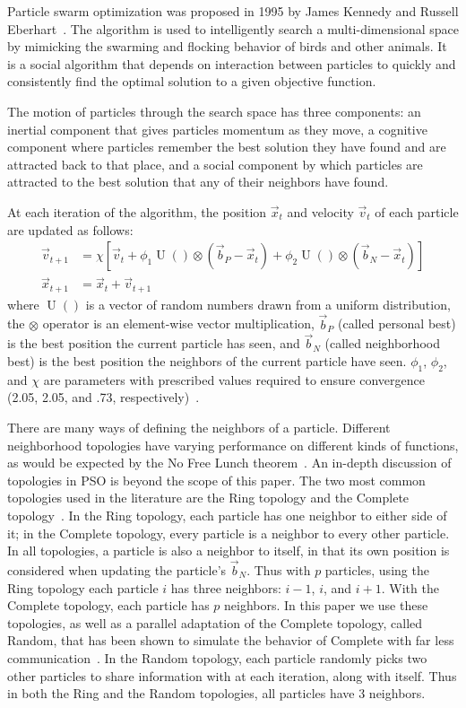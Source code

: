 \documentclass[oneside,honors]{honors}
\DeclareMathOperator{\URand}{U}
\providecommand{\ppos}{\ensuremath{\Vec{x}}}
\providecommand{\pvel}{\ensuremath{\Vec{v}}}
\providecommand{\nbest}{\ensuremath{\Vec{b}_N}}
\providecommand{\pbest}{\ensuremath{\Vec{b}_P}}
\providecommand{\constriction}{\ensuremath{\chi}}
\providecommand{\coeff}{\ensuremath{\phi}}
\begin{document}
Particle swarm optimization was proposed in 1995 by James Kennedy and Russell
Eberhart~\cite{kennedy-icnn95}.  The algorithm is used to intelligently search
a multi-dimensional space by mimicking the swarming and flocking behavior of
birds and other animals. It is a social algorithm that depends on interaction
between particles to quickly and consistently find the optimal solution to a
given objective function.

The motion of particles through the search space has three components: an
inertial component that gives particles momentum as they move, a cognitive
component where particles remember the best solution they have found and are
attracted back to that place, and a social component by which particles are
attracted to the best solution that any of their neighbors have found.

At each iteration of the algorithm, the position $\ppos_t$ and velocity
$\pvel_t$ of each particle are updated as follows:
\begin{align}
\label{eq:velupdate}
	\pvel_{t+1} &=
		\constriction \left[ \pvel_t +
			\coeff_1\URand()\otimes(\pbest - \ppos_t) +
			\coeff_2\URand()\otimes(\nbest - \ppos_t)
		\right] \\
\label{eq:posupdate}
	\ppos_{t+1} &= \ppos_t + \pvel_{t+1}
\end{align}
where \( \URand() \) is a vector of random numbers drawn from a uniform
distribution, the \( \otimes \) operator is an element-wise vector
multiplication, $\pbest$ (called personal best) is the best position the
current particle has seen, and $\nbest$ (called neighborhood best) is the best
position the neighbors of the current particle have seen.  \( \coeff_1 \), \(
\coeff_2 \), and \( \constriction \) are parameters with prescribed values
required to ensure convergence (2.05, 2.05, and .73,
respectively)~\cite{clerc-tec02}.

There are many ways of defining the neighbors of a particle.  Different
neighborhood topologies have varying performance on different kinds of
functions, as would be expected by the No Free Lunch
theorem~\cite{wolpert-tec97}.  An in-depth discussion of topologies in PSO is
beyond the scope of this paper.  The two most common topologies used in the
literature are the Ring topology and the Complete
topology~\cite{bratton-sis07}.  In the Ring topology, each particle has one
neighbor to either side of it; in the Complete topology, every particle is a
neighbor to every other particle.  In all topologies, a particle is also a
neighbor to itself, in that its own position is considered when updating the
particle's $\nbest$.  Thus with $p$ particles, using the Ring topology each
particle $i$ has three neighbors: $i-1$, $i$, and $i+1$.  With the Complete
topology, each particle has $p$ neighbors.  In this paper we use these
topologies, as well as a parallel adaptation of the Complete topology, called
Random, that has been shown to simulate the behavior of Complete with far less
communication~\cite{mcnabb-cec09}.  In the Random topology, each particle
randomly picks two other particles to share information with at each iteration,
along with itself.  Thus in both the Ring and the Random topologies, all
particles have 3 neighbors.
\end{document}
